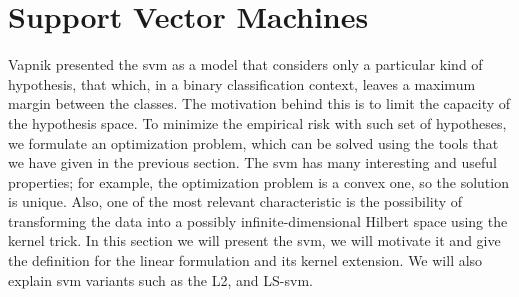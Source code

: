 \section{Support Vector Machines}
Vapnik presented the \acrshort{svm} as a model that considers only a particular kind of hypothesis, that which, in a binary classification context, leaves a maximum margin between the classes. The motivation behind this is to limit the capacity of the hypothesis space. To minimize the empirical risk with such set of hypotheses, we formulate an optimization problem, which can be solved using the tools that we have given in the previous section. The \acrshort{svm} has many interesting and useful properties; for example, the optimization problem is a convex one, so the solution is unique. Also, one of the most relevant characteristic is the possibility of transforming the data into a possibly infinite-dimensional Hilbert space using the kernel trick.
In this section we will present the \acrshort{svm}, we will motivate it and give the definition for the linear formulation and its kernel extension. We will also explain \acrshort{svm} variants such as the L2, and LS-\acrshort{svm}.

